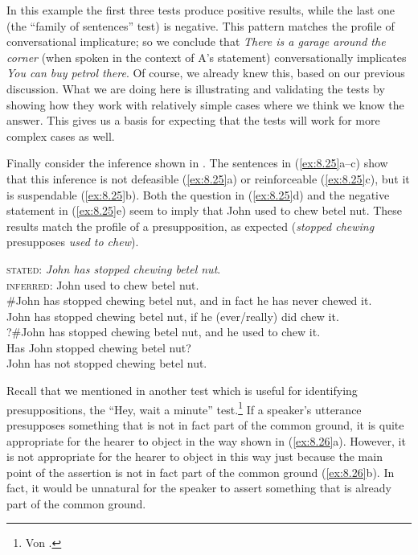 In this example the first three tests produce positive results, while the last one (the “family of sentences” test) is negative. This pattern matches the profile of conversational implicature; so we conclude that \textit{There is a garage around the corner} (when spoken in the context of A’s statement) conversationally implicates \textit{You can buy petrol there}. Of course, we already knew this, based on our previous discussion. What we are doing here is illustrating and validating the tests by showing how they work with relatively simple cases where we think we know the answer. This gives us a basis for expecting that the tests will work for more complex cases as well.



Finally consider the inference shown in . The sentences in (\ref{ex:8.25}a--c) show that this inference is not defeasible (\ref{ex:8.25}a) or reinforceable (\ref{ex:8.25}c), but it is suspendable (\ref{ex:8.25}b). Both the question in (\ref{ex:8.25}d) and the negative statement in (\ref{ex:8.25}e) seem to imply that John used to chew betel nut. These results match the profile of a presupposition, as expected (\textit{stopped chewing} presupposes \textit{used to chew}).


\begin{stylepoints} \label{ex:8.25}
\textsc{stated}: \textit{John has stopped chewing betel nut}.\\
\textsc{inferred}: John used to chew betel nut.\\
\ea \#John has stopped chewing betel nut, and in fact he has never chewed it.\\
\ex John has stopped chewing betel nut, if he (ever/really) did chew it.\\
\ex ?\#John has stopped chewing betel nut, and he used to chew it.\\
\ex Has John stopped chewing betel nut?\\
\ex John has not stopped chewing betel nut.
                       \z
\end{stylepoints}


Recall that we mentioned in  another test which is useful for identifying presuppositions, the “Hey, wait a minute” test.\footnote{Von \citet{Fintel2004}.} If a speaker’s utterance presupposes something that is not in fact part of the common ground, it is quite appropriate for the hearer to object in the way shown in (\ref{ex:8.26}a). However, it is not appropriate for the hearer to object in this way just because the main point of the assertion is not in fact part of the common ground (\ref{ex:8.26}b). In fact, it would be unnatural for the speaker to assert something that is already part of the common ground.


